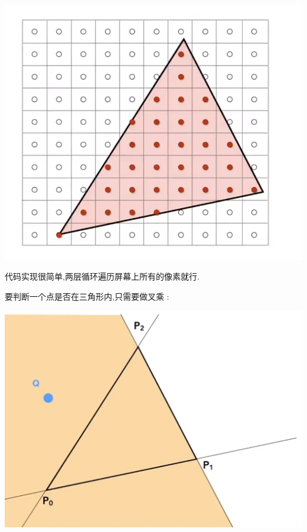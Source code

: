 \documentclass[UTF8,12pt]{ctexbook}
\begin{document}
{{{{{        \begin{center}
          \includegraphics[scale=0.5]{resources/sample_if_each_pixel_inside_triangle.png}
        \end{center}

        代码实现很简单,两层循环遍历屏幕上所有的像素就行.

        要判断一个点是否在三角形内,只需要做叉乘 :

        \begin{center}
          \includegraphics[scale=0.5]{resources/Triangle_Side_Cross_Prodyct.png}
        \end{center}

}}}}}
\end{document}
